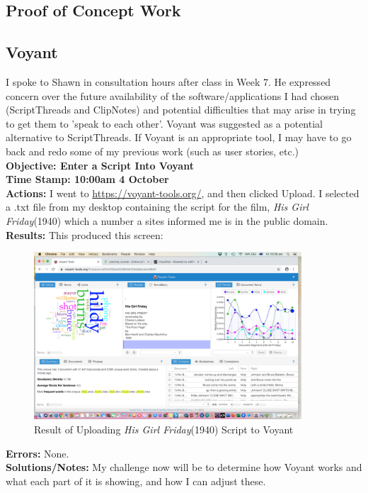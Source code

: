 \documentclass{article}
\begin{document}
\begin{FlushLeft}
\pagebreak

\section{Proof of Concept Work}

\subsection{Voyant}
I spoke to Shawn in consultation hours after class in Week 7. He expressed concern over the future availability of the software/applications I had chosen (ScriptThreads and ClipNotes) and potential difficulties that may arise in trying to get them to 'speak to each other'. Voyant was suggested as a potential alternative to ScriptThreads. If Voyant is an appropriate tool, I may have to go back and redo some of my previous work (such as user stories, etc.)\\
\vspace{5mm}
\textbf{Objective: Enter a Script Into Voyant}\\ 
\textbf{Time Stamp: 10:00am 4 October} \\
\textbf{Actions:} I went to \url{https://voyant-tools.org/}, and then clicked Upload. I selected a .txt file from my desktop containing the script for the film, \textit{His Girl Friday}(1940) which a number a sites informed me is in the public domain. \\
\textbf{Results:} This produced this screen:\\
\begin{figure}[htp]
    \centering
    \includegraphics[width=10cm]{Voyant_Result.png}
    \caption{Result of Uploading \textit{His Girl Friday}(1940) Script to Voyant}
\end{figure}
\textbf{Errors:} None.\\
\textbf{Solutions/Notes:} My challenge now will be to determine how Voyant works and what each part of it is showing, and how I can adjust these.\\

\end{FlushLeft}
\end{document}
